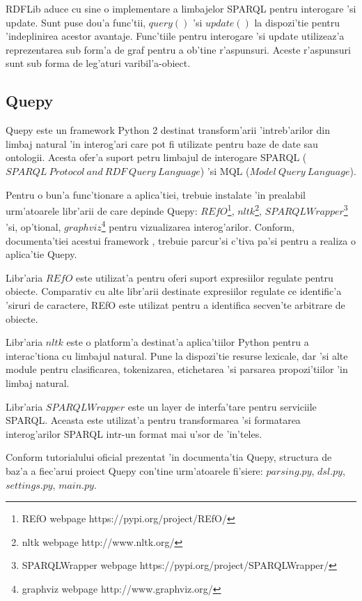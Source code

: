 \documentclass[12pt,a4paper,twoside]{report}
\begin{document}
RDFLib aduce cu sine o implementare a limbajelor SPARQL pentru interogare 'si update. Sunt puse dou'a func'tii, $query()$ 'si $update()$ la dispozi'tie pentru 'indeplinirea acestor avantaje. Func'tiile pentru interogare 'si update utilizeaz'a reprezentarea sub form'a de graf pentru a ob'tine r'aspunsuri. Aceste r'aspunsuri sunt sub forma de leg'aturi varibil'a-obiect.
\subsection{Quepy}

Quepy este un framework Python 2 destinat transform'arii 'intreb'arilor din limbaj natural 'in interog'ari care pot fi utilizate pentru baze de date sau ontologii. Acesta ofer'a suport petru limbajul de interogare SPARQL ($SPARQL\ Protocol\ and\ RDF\ Query\ Language$) 'si MQL ($Model\ Query\ Language$). 

Pentru o bun'a func'tionare a aplica'tiei, trebuie instalate 'in prealabil urm'atoarele libr'arii de care depinde Quepy:  $REfO$\footnote{REfO webpage https://pypi.org/project/REfO/}, $nltk$\footnote{nltk webpage http://www.nltk.org/}, $SPARQLWrapper$\footnote{SPARQLWrapper webpage https://pypi.org/project/SPARQLWrapper/} 'si, op'tional, $graphviz$\footnote{graphviz webpage http://www.graphviz.org/} pentru vizualizarea interog'arilor.
Conform, documenta'tiei acestui framework \cite{quepyCite}, trebuie parcur'si c\ia 'tiva pa'si pentru a realiza o aplica'tie Quepy. 

Libr'aria $REfO$ este utilizat'a pentru oferi suport expresiilor regulate pentru obiecte. Comparativ cu alte libr'arii destinate expresiilor regulate ce identific'a 'siruri de caractere, REfO este utilizat pentru a identifica secven'te arbitrare de obiecte. 

Libr'aria $nltk$ este o platform'a destinat'a aplica'tiilor Python pentru a interac'tiona cu limbajul natural. Pune la dispozi'tie resurse lexicale, dar 'si alte module pentru clasificarea, tokenizarea, etichetarea 'si parsarea propozi'tiilor 'in limbaj natural.

Libr'aria $SPARQLWrapper$ este un layer de interfa'tare pentru serviciile SPARQL. Aceasta este utilizat'a pentru transformarea 'si formatarea interog'arilor SPARQL intr-un format mai u'sor de 'in'teles.

Conform tutorialului oficial prezentat 'in documenta'tia Quepy, structura de baz'a a fiec'arui proiect Quepy con'tine urm'atoarele fi'siere: $parsing.py$, $dsl.py$, $settings.py$, $main.py$. 
\end{document}
